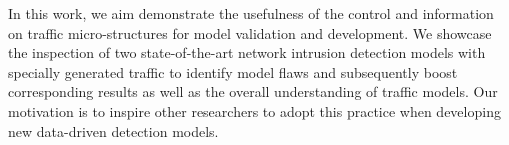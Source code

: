 \documentclass[conference]{IEEEtran}
\begin{document}
In this work, we aim demonstrate the usefulness of the control and information on traffic micro-structures for model validation and development. We showcase the inspection of two state-of-the-art network intrusion detection models with specially generated traffic to identify model flaws and subsequently boost corresponding results as well as the overall understanding of traffic models. Our motivation is to inspire other researchers to adopt this practice when developing new data-driven detection models.









\end{document}

